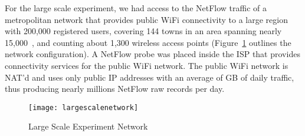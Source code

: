 \documentclass[10pt,conference,compsocconf,letterpaper]{IEEEtran}
\begin{document}
For the large scale experiment, we had access to the NetFlow traffic
of a metropolitan network that provides public WiFi
connectivity to a large region with 200,000 registered users, covering 144 towns in an area spanning 
nearly 15,000~, and counting about 1,300 wireless access points 
(Figure~\ref{fig:largescalenetwork} outlines the network configuration).
A NetFlow probe was placed inside the ISP that provides connectivity services 
for the public WiFi network. The public WiFi network is NAT'd and uses only  public IP addresses
with an average of  GB of daily traffic, thus producing nearly  millions
NetFlow raw records per day. 
\begin{figure}	
    \centering    
    \texttt{[image: largescalenetwork]}
    \caption{Large Scale Experiment Network}
\label{fig:largescalenetwork}
\end{figure}
\end{document}
